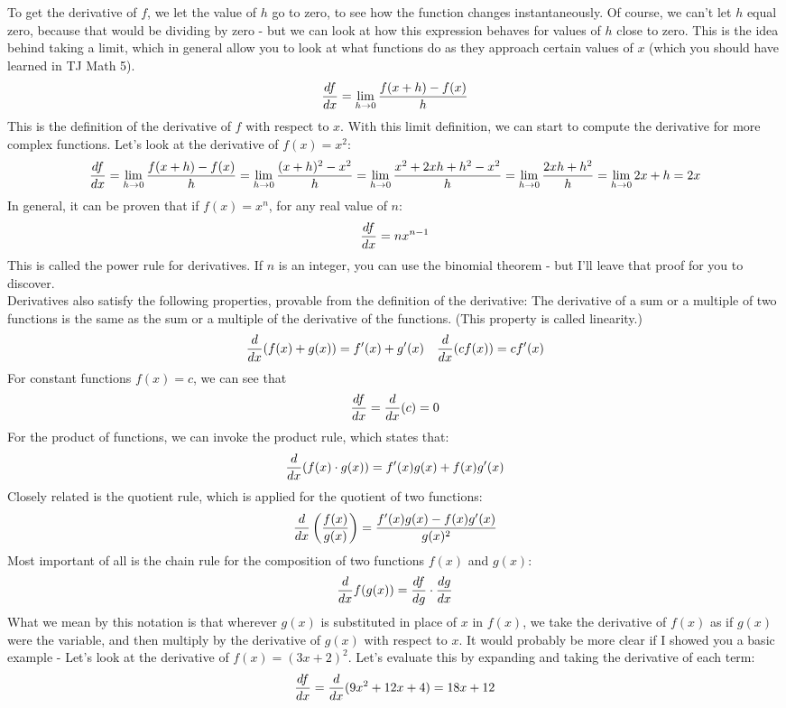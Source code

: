 To get the derivative of $f$, we let the value of $h$ go to zero, to see how the function changes instantaneously. Of course, we can't let $h$ equal zero, because that would be dividing by zero - but we can look at how this expression behaves for values of $h$ close to zero. This is the idea behind taking a limit, which in general allow you to look at what functions do as they approach certain values of $x$ (which you should have learned in TJ Math 5). 
\[
	\frac{d f}{d x} = \lim_{h\to 0} \frac{f(x+h) - f(x)}{h}
\]
This is the definition of the derivative of $f$ with respect to $x$. With this limit definition, we can start to compute the derivative for more complex functions. Let's look at the derivative of $f(x) = x^2$:
\[
	\frac{d f}{d x} = \lim_{h\to 0} \frac{f(x+h) - f(x)}{h} =  \lim_{h\to 0} \frac{(x+h)^2 - x^2}{h} =  \lim_{h\to 0} \frac{x^2 + 2xh + h^2 - x^2}{h} = \lim_{h\to 0} \frac{2xh + h^2}{h} = \lim_{h\to 0} 2x+h = 2x
\]
In general, it can be proven that if $f(x) = x^n$, for any real value of $n$: 
\[
	\frac{d f}{d x} = nx^{n-1}
\]	
This is called the power rule for derivatives. If $n$ is an integer, you can use the binomial theorem - but I'll leave that proof for you to discover. \\
Derivatives also satisfy the following properties, provable from the definition of the derivative:
The derivative of a sum or a multiple of two functions is the same as the sum or a multiple of the derivative of the functions. (This property is called linearity.) 
\[
	\frac{d }{d x}(f(x) + g(x)) = f'(x) + g'(x) \quad \frac{d }{d x}(cf(x)) = cf'(x) 
\]
For constant functions $f(x) = c$, we can see that 
\[
	\frac{d f}{d x} = \frac{d }{d x} (c) = 0
\]
For the product of functions, we can invoke the product rule, which states that:
\[
	\frac{d }{d x}(f(x) \cdot g(x)) = f'(x) g(x) + f(x) g'(x)
\]
Closely related is the quotient rule, which is applied for the quotient of two functions:
\[
	\frac{d }{d x}\left(\frac{f(x)}{g(x)}\right) = \frac{f'(x) g(x) - f(x) g'(x)}{g(x)^2}
\]
Most important of all is the chain rule for the composition of two functions $f(x)$ and $g(x)$:
\[
	\frac{d }{d x}f(g(x)) = \frac{d f}{d g} \cdot \frac{d g}{d x}
\]
What we mean by this notation is that wherever $g(x)$ is substituted in place of $x$ in $f(x)$, we take the derivative of $f(x)$ as if $g(x)$ were the variable, and then multiply by the derivative of $g(x)$ with respect to $x$. It would probably be more clear if I showed you a basic example - Let's look at the derivative of $f(x) = (3x+2)^2$. Let's evaluate this by expanding and taking the derivative of each term:
\[
	\frac{d f}{d x} = \frac{d }{d x} (9x^2 + 12x + 4) = 18x + 12
\]

